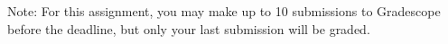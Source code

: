 \documentclass[11pt]{article}
\numberwithin{equation}{section} %
\numberwithin{figure}{section} %
\numberwithin{table}{section} %
\begin{document}

Note: For this assignment, you may make up to 10 submissions to Gradescope before the deadline, but only your last submission will be graded.
 
%

%
%

%
\end{document}
